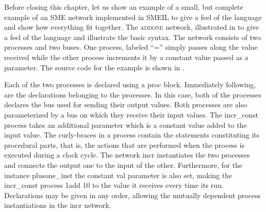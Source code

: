 Before closing this chapter, let us show an example of a small, but complete
example of an SME network implemented in SMEIL to give a feel of the language
and show how everything fit together. The \textsc{addone} network,
illustrated in  to give a feel of the language and illustrate
the basic syntax. The network consists of two processes and two buses. One
process, labeled ``='' simply passes along the value received while the other
process increments it by a constant value passed as a parameter. The source code
for the example is shown in .

Each of the two processes is declared using a {\ttfamily proc} block. Immediately
following, are the declarations belonging to the processes. In this case, both
of the processes declares the bus used for sending their output values. Both
processes are also parameterized by a bus on which they receive their input
values. The {\ttfamily incr\_const} process takes an additional parameter which is a
constant value added to the input value. The curly-braces in a process contain
the statements constituting its procedural parts, that is, the actions that are
performed when the process is executed during a clock cycle. The network {\ttfamily
  incr} instantiates the two processes and connects the output one to the input
of the other. Furthermore, for the instance {\ttfamily plusone\_inst} the constant
{\ttfamily val} parameter is also set, making the {\ttfamily incr\_const} process 1add 10 to
the value it receives every time its run. Declarations may be given in any
order, allowing the mutually dependent process instantiations in the {\ttfamily incr}
network.








